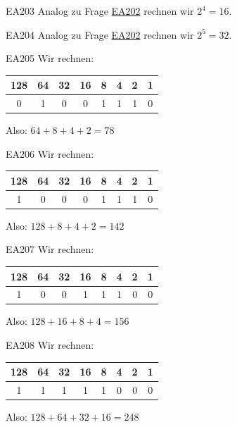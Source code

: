\documentclass[10pt,a4paper,ngerman]{article}
\theoremstyle{definition}
\theoremstyle{plain}
\theoremstyle{mytheorem}
\newcommand{\qref}[1]{\hyperref[#1]{#1}}
\theoremstyle{definition}
\begin{document}
\begin{sol}{EA203}
Analog zu Frage \qref{EA202} rechnen wir $2^4 = 16$.
\end{sol}

\begin{sol}{EA204}
Analog zu Frage \qref{EA202} rechnen wir $2^5 = 32$.
\end{sol}


\begin{sol}{EA205}
  Wir rechnen:
  \begin{center}
\begin{tabular}{|c|c|c|c|c|c|c|c|} 
128& 64&32&16 &8 & 4 & 2 & 1 \\ \hline
0&1&0&0&1&1&1&0
\end{tabular}

\end{center}
Also: $64+8+4+2 = 78$ 
\end{sol} 

\begin{sol}{EA206}
  Wir rechnen:
  \begin{center}
\begin{tabular}{|c|c|c|c|c|c|c|c|} 
128& 64&32&16 &8 & 4 & 2 & 1 \\ \hline
1&0&0&0&1&1&1&0
\end{tabular}

\end{center}
Also: $128+8+4+2 = 142$ 
\end{sol}  


\begin{sol}{EA207}
  Wir rechnen:
  \begin{center}
\begin{tabular}{|c|c|c|c|c|c|c|c|} 
128& 64&32&16 &8 & 4 & 2 & 1 \\ \hline
1&0&0&1&1&1&0&0
\end{tabular}
\end{center}
Also: $128+16+8+4 = 156$ 
\end{sol}  


\begin{sol}{EA208}
  Wir rechnen:
  \begin{center}
\begin{tabular}{|c|c|c|c|c|c|c|c|} 
128& 64&32&16 &8 & 4 & 2 & 1 \\ \hline
1&1&1&1&1&0&0&0
\end{tabular}
\end{center}
Also: $128+64+32+16 = 248$ 
\end{sol}  
\end{document}
